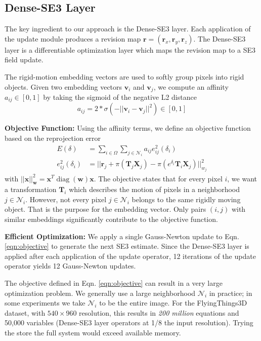 \documentclass[final]{cvpr}
\DeclareMathOperator{\diag}{diag}
\begin{document}
\subsection{Dense-SE3 Layer}
The key ingredient to our approach is the Dense-SE3 layer. Each application of the update module produces a revision map $\mathbf{r}=(\mathbf{r}_x, \mathbf{r}_y, \mathbf{r}_z)$. The Dense-SE3 layer is a differentiable optimization layer which maps the revision map to a SE3 field update.

The rigid-motion embedding vectors are used to softly group pixels into rigid objects. Given two embedding vectors $\mathbf{v}_i$ and $\mathbf{v}_j$, we compute an affinity $a_{ij} \in [0,1]$ by taking the sigmoid of the negative L2 distance
\begin{equation}
    a_{ij} = 2 * \sigma(-||\mathbf{v}_i - \mathbf{v}_j||^2) \in [0,1]
\end{equation}

\noindent \textbf{Objective Function:} Using the affinity terms, we define an objective function based on the reprojection error
\begin{align}
    E(\delta) &= \sum_{i \in \Omega} \sum_{j \in \mathcal{N}_i} a_{ij} e^2_{ij}(\delta_i) \\
    e^2_{ij}(\delta_i) &= ||\mathbf{r}_j + \pi(\mathbf{T}_j \mathbf{X}_j) - \pi(e^{\delta_i} \mathbf{T}_i \mathbf{X}_j)||^2_{w_j}
    \label{eqn:objective}
\end{align}
with $||\mathbf{x}||_\mathbf{w}^2 = \mathbf{x}^T \diag(\mathbf{w}) \mathbf{x}$. The objective states that for every pixel $i$, we want a transformation $\mathbf{T}_i$ which describes the motion of pixels in a neighborhood $j \in \mathcal{N}_i$. However, not every pixel $j \in \mathcal{N}_i$ belongs to the same rigidly moving object. That is the purpose for the embedding vector. Only pairs $(i,j)$ with similar embeddings significantly contribute to the objective function. 

\vspace{1mm} \noindent \textbf{Efficient Optimization:} We apply a single Gauss-Newton update to Eqn. \ref{eqn:objective} to generate the next SE3 estimate. Since the Dense-SE3 layer is applied after each application of the update operator, 12 iterations of the update operator yields 12 Gauss-Newton updates.

The objective defined in Eqn. \ref{eqn:objective} can result in a very large optimization problem. We generally use a large neighborhood $\mathcal{N}_i$ in practice; in some experiments we take $\mathcal{N}_i$ to be the entire image. For the FlyingThings3D dataset, with $540\times960$ resolution, this results in \emph{200 million} equations and 50,000 variables (Dense-SE3 layer operators at 1/8 the input resolution). Trying the store the full system would exceed available memory. 
\end{document}
